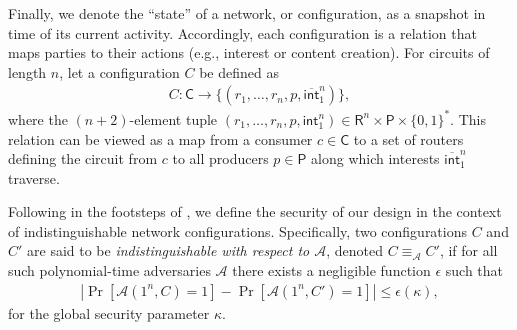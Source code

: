 \documentclass[10pt]{article}
\begin{document}
Finally, we denote the ``state'' of a network, or configuration, as a snapshot in time of its current activity. Accordingly, each configuration is a relation that maps parties to their actions (e.g., interest or content creation). For circuits of length $n$, let a configuration $C$ be defined as
\begin{align*}
C : \mathsf{C} \to \{(r_1,\dots,r_n,p,\overline{\mathsf{int}}_1^n)\},
\end{align*}
where the $(n + 2)$-element tuple $(r_1,\dots,r_n,p,\mathsf{int}_1^n) \in \mathsf{R}^n \times \mathsf{P} \times \{0,1\}^*$. This relation can be viewed as a map from a consumer $c \in \mathsf{C}$ to a set of routers defining the circuit from $c$ to all producers $p \in \mathsf{P}$ along which interests $\overline{\mathsf{int}}_1^n$ traverse. 

Following in the footsteps of \cite{andana}, we define the security of our design in the context of indistinguishable network configurations. Specifically, two configurations $C$ and $C'$ are said to be \emph{indistinguishable with respect to $\mathcal{A}$}, denoted $C \equiv_{\mathcal{A}} C'$, if for all such polynomial-time adversaries $\mathcal{A}$ there exists a negligible function $\epsilon$ such that 
\begin{align*}
\left|\Pr[\mathcal{A}(1^n, C) = 1] - \Pr[\mathcal{A}(1^n, C') = 1]\right| \leq \epsilon(\kappa),
\end{align*}
for the global security parameter $\kappa$.
\end{document}
